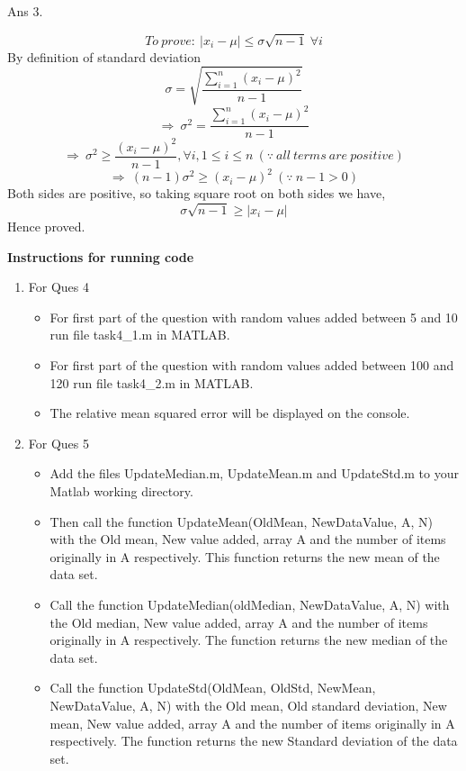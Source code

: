 \documentclass[11pt]{article}
\begin{document}
Ans 3.\begin{center}
$$To\ prove:\ |x_i - \mu| \le \sigma\sqrt{n-1}\ \forall i$$ \newline
By definition of standard deviation
$$\sigma = \sqrt{\frac{\sum\limits_{i=1}^n(x_i-\mu)^2}{n-1}}$$
$$\Rightarrow\ \sigma^2=\frac{\sum\limits_{i=1}^n(x_i-\mu)^2}{n-1}$$
$$\Rightarrow\ \sigma^2\ge\frac{(x_i-\mu)^2}{n-1}, \forall i,1\le i\le n\ (\because\ all\ terms\ are\ positive)$$
$$\Rightarrow\ (n-1)\sigma^2 \ge (x_i-\mu)^2\ (\because\ n-1 > 0)$$
Both sides are positive, so taking square root on both sides we have,
$$\sigma\sqrt{n-1} \ge |x_i-\mu|$$
Hence proved.

\vspace{50px}

\textbf{Instructions for running code}
\begin{enumerate}
\item For Ques 4
\begin{itemize}
\item For first part of the question with random values added between 5 and 10 run file task4\_1.m in MATLAB.
\item For first part of the question with random values added between 100 and 120 run file task4\_2.m in MATLAB.
\item The relative mean squared error will be displayed on the console.
\end{itemize}
\item For Ques 5
\begin{itemize}
\item Add the files UpdateMedian.m, UpdateMean.m and UpdateStd.m to your Matlab working directory.
\item Then call the function UpdateMean(OldMean, NewDataValue, A, N) with the Old mean, New value added, array A and the number of items originally in A respectively. This function returns the new mean of the data set.
\item Call the function UpdateMedian(oldMedian, NewDataValue, A, N) with the Old median, New value added, array A and the number of items originally in A respectively. The function returns the new median of the data set.
\item Call the function UpdateStd(OldMean, OldStd, NewMean, NewDataValue, A, N) with the Old mean, Old standard deviation, New mean, New value added, array A and the number of items originally in A respectively. The function returns the new Standard deviation of the data set.
\end{itemize}
\end{enumerate}
\end{center}
\end{document}
